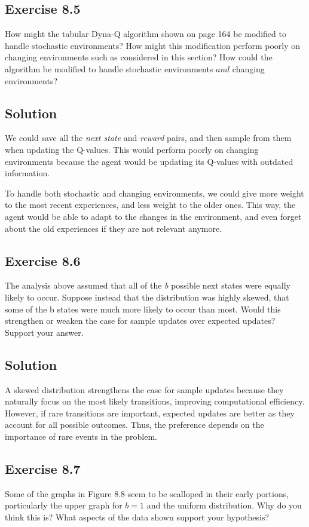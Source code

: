 \subsection*{Exercise 8.5}
How might the tabular Dyna-Q algorithm shown on page 164 be modified
to handle stochastic environments? How might this modification perform poorly on
changing environments such as considered in this section? How could the algorithm be
modified to handle stochastic environments $\textit{and}$ changing environments? 

\subsection*{Solution}

We could save all the \textit{next state} and \textit{reward} pairs, and then sample from them when updating the Q-values. This would perform poorly on changing environments because the agent would be updating its Q-values with outdated information.

To handle both stochastic and changing environments, we could give more weight to the most recent experiences, and less weight to the older ones. This way, the agent would be able to adapt to the changes in the environment, and even forget about the old experiences if they are not relevant anymore.

\subsection*{Exercise 8.6}
The analysis above assumed that all of the \textit{b} possible next states were
equally likely to occur. Suppose instead that the distribution was highly skewed, that
some of the b states were much more likely to occur than most. Would this strengthen or
weaken the case for sample updates over expected updates? Support your answer. 

\subsection*{Solution}
A skewed distribution strengthens the case for sample updates because they naturally focus on the most likely transitions, improving computational efficiency. However, if rare transitions are important, expected updates are better as they account for all possible outcomes. Thus, the preference depends on the importance of rare events in the problem.

\subsection*{Exercise 8.7}
Some of the graphs in Figure 8.8 seem to be scalloped in their early portions,
particularly the upper graph for $b = 1$ and the uniform distribution. Why do you think
this is? What aspects of the data shown support your hypothesis? 

